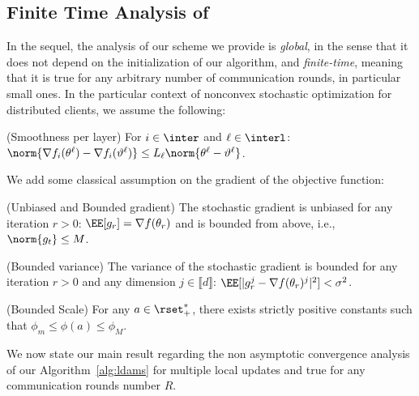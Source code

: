 \documentclass[nohyperref]{article}
\begin{document}
\subsection{Finite Time Analysis of \algo}
In the sequel, the analysis of our scheme we provide is \emph{global}, in the sense that it does not depend on the initialization of our algorithm, and \emph{finite-time}, meaning that it is true for any arbitrary number of communication rounds, in particular small ones.
In the particular context of nonconvex stochastic optimization for distributed clients, we assume the following:

\vspace{0.1in}

\begin{assumption}\label{ass:smooth}(Smoothness per layer)
For $i \in \inter$ and $\ell \in \interl$: $\norm{\nabla f_i (\theta^\ell) - \nabla f_i (\vartheta^\ell)} \leq L_\ell \norm{\theta^\ell-\vartheta^\ell}$.
\end{assumption}
We add some classical assumption on the gradient of the objective function:
\begin{assumption}\label{ass:boundgrad}(Unbiased and Bounded gradient)
The stochastic gradient is unbiased for any iteration $r>0$: $\EE[g_r] = \nabla f(\theta_r)$ and is bounded from above, i.e., $\norm{g_t} \leq M$.
\end{assumption}

\begin{assumption}\label{ass:var}(Bounded variance)
The variance of the stochastic gradient is bounded for any iteration $r>0$ and any dimension $j \in \llbracket d \rrbracket$: $\EE[|g_r^j - \nabla f(\theta_r)^j|^2] < \sigma^2$.
\end{assumption}

\begin{assumption}\label{ass:phi}(Bounded Scale)
For any $a \in \rset^*_+$, there exists strictly positive constants such that $\phi_m \leq  \phi(a) \leq \phi_M$.
\end{assumption}



We now state our main result regarding the non asymptotic convergence analysis of our Algorithm~\ref{alg:ldams} for multiple local updates and true for any communication rounds number $R$.
\end{document}
